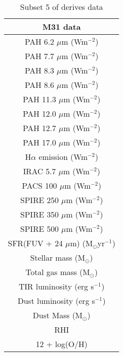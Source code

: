 \begin{table}
\centering
\caption{Subset 5 of derives data}
\label{tab: subset3}
\begin{tabular}{ |c| }
\hline
M31 data  \\
\hline\hline
PAH 6.2 $\mu$m (Wm$^{-2}$)  \\
PAH 7.7 $\mu$m (Wm$^{-2}$)  \\
PAH 8.3 $\mu$m (Wm$^{-2}$)  \\
PAH 8.6 $\mu$m (Wm$^{-2}$)  \\
PAH 11.3 $\mu$m (Wm$^{-2}$)  \\
PAH 12.0 $\mu$m (Wm$^{-2}$) \\
PAH 12.7 $\mu$m (Wm$^{-2}$)  \\
PAH 17.0 $\mu$m (Wm$^{-2}$)  \\
H$\alpha$ emission (Wm$^{-2}$) \\
IRAC 5.7 $\mu$m (Wm$^{-2}$)\\
PACS 100 $\mu$m (Wm$^{-2}$)\\
SPIRE 250 $\mu$m (Wm$^{-2}$)\\
SPIRE 350 $\mu$m (Wm$^{-2}$)\\
SPIRE 500 $\mu$m (Wm$^{-2}$)\\
SFR(FUV + 24 $\mu$m) (M$_{\odot}$yr$^{-1}$) \\
Stellar mass (M$_{\odot}$)\\
Total gas mass (M$_{\odot}$)  \\
TIR luminosity (erg s$^{-1}$)  \\
Dust luminosity (erg s$^{-1}$)  \\
Dust Mass (M$_{\odot}$)\\
RHI \\
12 + log(O/H)\\
\hline
\end{tabular}
\end{table}